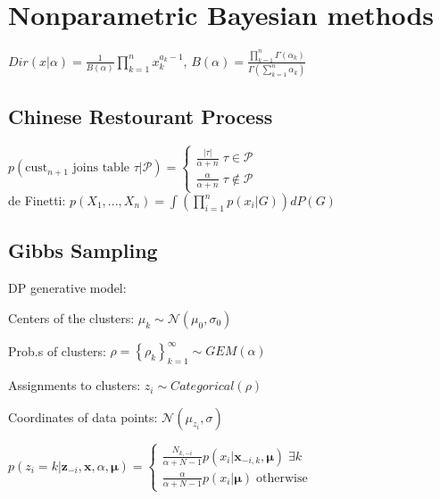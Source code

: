 \section{Nonparametric Bayesian methods}
$Dir(x|\alpha) = \frac{1}{B(\alpha)} \prod_{k=1}^n x_k^{a_k - 1}$, $B(\alpha) = \frac{\prod_{k=1}^n \Gamma(\alpha_k)}{\Gamma(\sum_{k=1}^n \alpha_k)}$ 
\subsection*{Chinese Restourant Process}
\(
   p(\text{cust}_{n+1} \text{ joins table } \tau\vert\mathcal{P})=
   \begin{cases}
      \frac{\vert\tau\vert}{\alpha + n} \; \tau\in\mathcal{P} \\
      \frac{\alpha}{\alpha + n} \;\tau\notin\mathcal{P} 
   \end{cases}
\)\\ 
de Finetti: $p(X_1, ..., X_n) {=} \int (\prod_{i=1}^n p(x_i|G))dP(G)$ 
\subsection*{Gibbs Sampling}
DP generative model: \\
\begin{inparaitem}[\color{red}\textbullet]
\item Centers of the clusters: $\mu_k \sim \mathcal{N}(\mu_0, \sigma_0)$ \\
\item Prob.s of clusters: $\rho = \left\{\rho_k\right\}_{k=1}^\infty \sim  GEM(\alpha)$ \\
\item Assignments to clusters: $z_i \sim Categorical(\rho)$ \\
\item Coordinates of data points: $\mathcal{N}(\mu_{z_i}, \sigma)$\\
\end{inparaitem}
\(
   p(z_i=k|\bm{z}_{-i},\bm{x},\alpha,\bm{\mu}) = 
   \begin{cases}
      \frac{N_{k,-i}}{\alpha + N - 1} p(x_i|\bm{x}_{-i,k},\bm{\mu}) \;\exists k \\
      \frac{\alpha}{\alpha + N - 1} p(x_i|\bm{\mu}) \;\text{otherwise}
   \end{cases}
\)